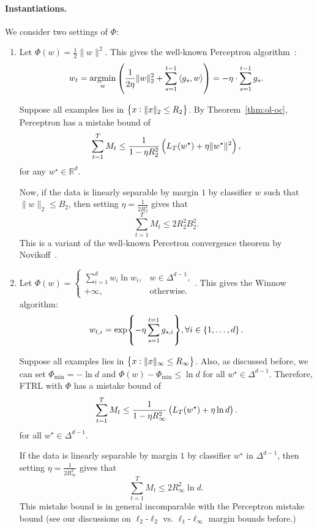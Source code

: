 \documentclass{article}
\DeclareMathOperator*{\argmin}{{\rm argmin}}
\newcommand{\RR}{\mathbb{R}} %
\newcommand{\inner}[2]{\left\langle #1,#2 \right\rangle}
\begin{document}
\paragraph{Instantiations.} We consider two settings of $\Phi$:
\begin{enumerate}
\item Let $\Phi(w) = \frac{1}{2}\|w\|^2$. This gives the well-known Perceptron algorithm~\cite{rosenblatt1958perceptron}:
\[ w_t = \argmin_{w} \del{ \frac{1}{2\eta}\| w \|_2^2 + \sum_{s=1}^{t-1} \inner{g_s}{w}} = -\eta \cdot \sum_{s=1}^{t-1} g_s. \]

Suppose all examples lies in $\cbr{x: \|x\|_2 \leq R_2}$.
By Theorem~\ref{thm:ol-oc}, Perceptron has a mistake bound of
\[ \sum_{t=1}^T M_t \leq \frac{1}{1-\eta R_2^2}\del{L_T(w^\star) + \eta\| w^\star \|^2}, \]
for any $w^\star \in \RR^d$.

Now, if the data is linearly separable by margin $1$ by classifier $w$ such that $\| w \|_2 \leq B_2$, then setting $\eta = \frac{1}{2R_2^2}$ gives that
\[ \sum_{t=1}^T M_t \leq 2 R_2^2 B_2^2. \]
This is a variant of the well-known Percetron convergence theorem by Novikoff~\cite{rosenblatt1958perceptron}.

\item Let $\Phi(w) = \begin{cases} \sum_{i=1}^d w_i \ln w_i, & w \in \Delta^{d-1}, \\ +\infty, & \text{otherwise}. \end{cases}$. This gives the  Winnow~\cite{littlestone1988learning} algorithm:
\[ w_{t,i} = \exp{-\eta \sum_{s=1}^{t=1} g_{s,i}}, \forall i \in \cbr{1,\ldots,d}. \]

Suppose all examples lies in $\cbr{x: \|x\|_\infty \leq R_\infty}$. Also, as discussed before, we can set $\Phi_{\min} = -\ln d$ and $\Phi(w) - \Phi_{\min} \leq \ln d$ for all $w^\star \in \Delta^{d-1}$. Therefore,
FTRL with $\Phi$ has a mistake bound of
\[ \sum_{t=1}^T M_t \leq \frac{1}{1-\eta R_\infty^2}\del{L_T(w^\star) + \eta \ln d}. \]
for all $w^\star \in \Delta^{d-1}$.

If the data is linearly separable by margin $1$ by classifier $w^\star$ in $\Delta^{d-1}$, then setting $\eta = \frac{1}{2R_\infty^2}$ gives that
\[ \sum_{t=1}^T M_t \leq 2 R_\infty^2 \ln d. \]
This mistake bound is in general incomparable with the Perceptron mistake bound (see our discussions on $\ell_2$-$\ell_2$ vs. $\ell_1$-$\ell_\infty$ margin bounds before.)
\end{enumerate}
\end{document}
